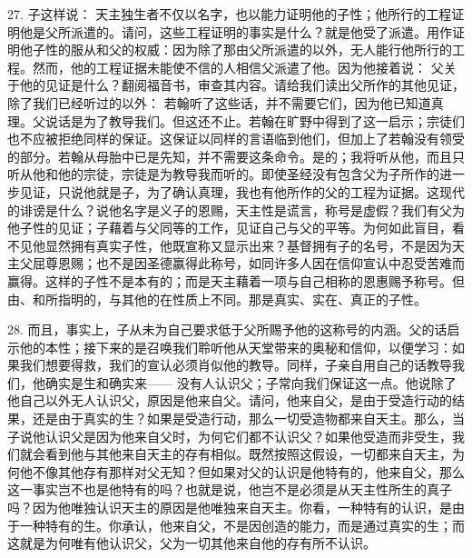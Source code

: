 27. 子这样说：  天主独生者不仅以名字，也以能力证明他的子性；他所行的工程证明他是父所派遣的。请问，这些工程证明的事实是什么？就是他受了派遣。用作证明他子性的服从和父的权威：因为除了那由父所派遣的以外，无人能行他所行的工程。然而，他的工程证据未能使不信的人相信父派遣了他。因为他接着说： 父关于他的见证是什么？翻阅福音书，审查其内容。请给我们读出父所作的其他见证，除了我们已经听过的以外： 若翰听了这些话，并不需要它们，因为他已知道真理。父说话是为了教导我们。但这还不止。若翰在旷野中得到了这一启示；宗徒们也不应被拒绝同样的保证。这保证以同样的言语临到他们，但加上了若翰没有领受的部分。若翰从母胎中已是先知，并不需要这条命令。是的；我将听从他，而且只听从他和他的宗徒，宗徒是为教导我而听的。即使圣经没有包含父为子所作的进一步见证，只说他就是子，为了确认真理，我也有他所作的父的工程为证据。这现代的诽谤是什么？说他名字是义子的恩赐，天主性是谎言，称号是虚假？我们有父为他子性的见证；子藉着与父同等的工作，见证自己与父的平等。为何如此盲目，看不见他显然拥有真实子性，他既宣称又显示出来？基督拥有子的名号，不是因为天主父屈尊恩赐；也不是因圣德赢得此称号，如同许多人因在信仰宣认中忍受苦难而赢得。这样的子性不是本有的；而是天主藉着一项与自己相称的恩惠赐予称号。但由、和所指明的，与其他的在性质上不同。那是真实、实在、真正的子性。\par

28. 而且，事实上，子从未为自己要求低于父所赐予他的这称号的内涵。父的话启示他的本性；接下来的是召唤我们聆听他从天堂带来的奥秘和信仰，以便学习：如果我们想要得救，我们的宣认必须肖似他的教导。同样，子亲自用自己的话教导我们，他确实是生和确实来——  没有人认识父；子常向我们保证这一点。他说除了他自己以外无人认识父，原因是他来自父。请问，他来自父，是由于受造行动的结果，还是由于真实的生？如果是受造行动，那么一切受造物都来自天主。那么，当子说他认识父是因为他来自父时，为何它们都不认识父？如果他受造而非受生，我们就会看到他与其他来自天主的存有相似。既然按照这假设，一切都来自天主，为何他不像其他存有那样对父无知？但如果对父的认识是他特有的，他来自父，那么这一事实岂不也是他特有的吗？也就是说，他岂不是必须是从天主性所生的真子吗？因为他唯独认识天主的原因是他唯独来自天主。你看，一种特有的认识，是由于一种特有的生。你承认，他来自父，不是因创造的能力，而是通过真实的生；而这就是为何唯有他认识父，父为一切其他来自他的存有所不认识。\par

